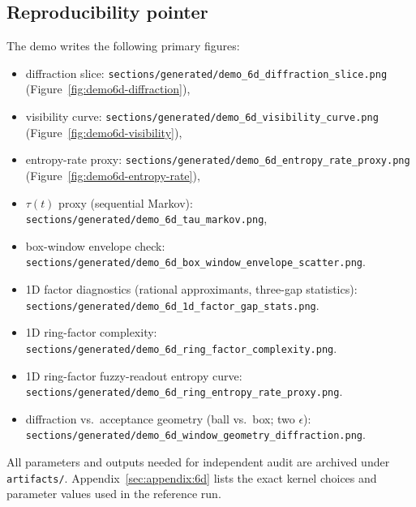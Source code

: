 \subsection{Reproducibility pointer}
The demo writes the following primary figures:
\begin{itemize}[leftmargin=*,itemsep=2pt]
  \item diffraction slice: \texttt{sections/generated/demo\_6d\_diffraction\_slice.png} (Figure~\ref{fig:demo6d-diffraction}),
  \item visibility curve: \texttt{sections/generated/demo\_6d\_visibility\_curve.png} (Figure~\ref{fig:demo6d-visibility}),
  \item entropy-rate proxy: \texttt{sections/generated/demo\_6d\_entropy\_rate\_proxy.png} (Figure~\ref{fig:demo6d-entropy-rate}),
  \item $\tau(t)$ proxy (sequential Markov): \texttt{sections/generated/demo\_6d\_tau\_markov.png},
  \item box-window envelope check: \texttt{sections/generated/demo\_6d\_box\_window\_envelope\_scatter.png}.
  \item 1D factor diagnostics (rational approximants, three-gap statistics): \texttt{sections/generated/demo\_6d\_1d\_factor\_gap\_stats.png}.
  \item 1D ring-factor complexity: \texttt{sections/generated/demo\_6d\_ring\_factor\_complexity.png}.
  \item 1D ring-factor fuzzy-readout entropy curve: \texttt{sections/generated/demo\_6d\_ring\_entropy\_rate\_proxy.png}.
  \item diffraction vs.\ acceptance geometry (ball vs.\ box; two $\epsilon$): \texttt{sections/generated/demo\_6d\_window\_geometry\_diffraction.png}.
\end{itemize}
All parameters and outputs needed for independent audit are archived under \texttt{artifacts/}. Appendix~\ref{sec:appendix:6d} lists the exact kernel choices and parameter values used in the reference run.


